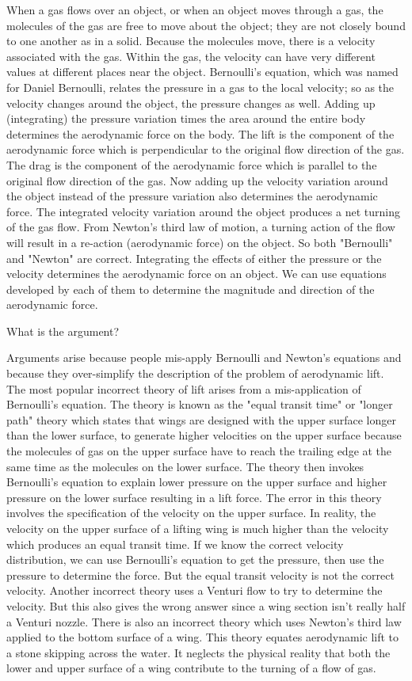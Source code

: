 	When a gas flows over an object, or when an object moves through a gas, the molecules of the gas are free to move about the object; they are not closely bound to one another as in a solid. Because the molecules move, there is a velocity associated with the gas. Within the gas, the velocity can have very different values at different places near the object. Bernoulli's equation, which was named for Daniel Bernoulli, relates the pressure in a gas to the local velocity; so as the velocity changes around the object, the pressure changes as well. Adding up (integrating) the pressure variation times the area around the entire body determines the aerodynamic force on the body. The lift is the component of the aerodynamic force which is perpendicular to the original flow direction of the gas. The drag is the component of the aerodynamic force which is parallel to the original flow direction of the gas. Now adding up the velocity variation around the object instead of the pressure variation also determines the aerodynamic force. The integrated velocity variation around the object produces a net turning of the gas flow. From Newton's third law of motion, a turning action of the flow will result in a re-action (aerodynamic force) on the object. So both "Bernoulli" and "Newton" are correct. Integrating the effects of either the pressure or the velocity determines the aerodynamic force on an object. We can use equations developed by each of them to determine the magnitude and direction of the aerodynamic force.
	
	What is the argument?

	Arguments arise because people mis-apply Bernoulli and Newton's equations and because they over-simplify the description of the problem of aerodynamic lift. The most popular incorrect theory of lift arises from a mis-application of Bernoulli's equation. The theory is known as the "equal transit time" or "longer path" theory which states that wings are designed with the upper surface longer than the lower surface, to generate higher velocities on the upper surface because the molecules of gas on the upper surface have to reach the trailing edge at the same time as the molecules on the lower surface. The theory then invokes Bernoulli's equation to explain lower pressure on the upper surface and higher pressure on the lower surface resulting in a lift force. The error in this theory involves the specification of the velocity on the upper surface. In reality, the velocity on the upper surface of a lifting wing is much higher than the velocity which produces an equal transit time. If we know the correct velocity distribution, we can use Bernoulli's equation to get the pressure, then use the pressure to determine the force. But the equal transit velocity is not the correct velocity. Another incorrect theory uses a Venturi flow to try to determine the velocity. But this also gives the wrong answer since a wing section isn't really half a Venturi nozzle. There is also an incorrect theory which uses Newton's third law applied to the bottom surface of a wing. This theory equates aerodynamic lift to a stone skipping across the water. It neglects the physical reality that both the lower and upper surface of a wing contribute to the turning of a flow of gas.


